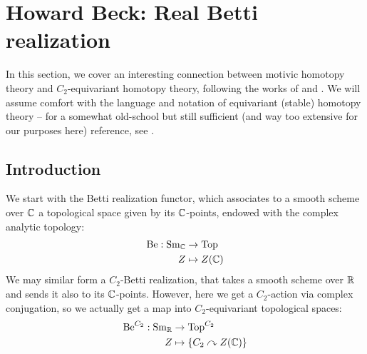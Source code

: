 \providecommand{\Be}{\mathrm{Be}}
\providecommand{\Loop}{\Omega}
\providecommand{\Smash}{\wedge}
\providecommand{\Sph}{\mathbb{S}}
\providecommand{\triv}{\mathrm{triv}}
\providecommand{\isom}{\simeq}
\providecommand{\GeomFix}{\Phi}

\providecommand{\SHRcell}{\SH_{\mathrm{cell}} (\R)}
\providecommand{\SpCt}{\Sp^{C_2}}
\providecommand{\BeCt}{\Be^{C_2}}
\providecommand{\pcomp}{_p^{\wedge}}
\providecommand{\pBeCt}{\widehat{\Be}_p^{C_2}}
\providecommand{\pSHRcell}{\SHRcell\pcomp}
\providecommand{\pSpCt}{(\SpCt)\pcomp}

\newcommand{\defas}[1]{\textit{#1}}

\section{Howard Beck: Real Betti realization}
In this section, we cover an interesting connection between motivic homotopy theory and $ C_2 $-equivariant homotopy theory, following the works of \cite{Bachmann-betti} and \cite{BehrensShah-C2betti}.
We will assume comfort with the language and notation of equivariant (stable) homotopy theory -- for a somewhat old-school but still sufficient (and way too extensive for our purposes here) reference, see \cite{GreenleesMay}.

\subsection{Introduction}
We start with the Betti realization functor, which associates to a smooth scheme over $ \mathbb{C} $ a topological space given by its $ \mathbb{C} $-points, endowed with the complex analytic topology:
\begin{align*}
\Be: \Sm_\C &\to \Top \\
Z &\mapsto Z(\C)
\end{align*}
We may similar form a $ C_2 $-Betti realization, that takes a smooth scheme over $ \mathbb{R} $ and sends it also to its $ \mathbb{C} $-points.
However, here we get a $ C_2 $-action via complex conjugation, so we actually get a map into $ C_2 $-equivariant topological spaces:
\begin{align*}
\BeCt: \Sm_\R &\to \Top^{C_2} \\
Z &\mapsto \{C_2 \curvearrowright Z(\C) \}
\end{align*}

